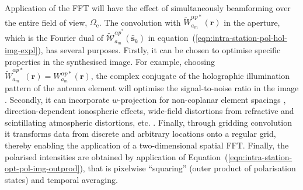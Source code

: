 \documentclass[
  journal=pasa,
  manuscript=article-type,
  year=2020,
  volume=37,
]{cup-journal}
\begin{document}

Application of the FFT will have the effect of simultaneously beamforming over the entire field of view, $\Omega_\textrm{e}$. The convolution with $\widetilde{W}_{a_m}^{\alpha p*}(\boldsymbol{r})$ in the aperture, which is the Fourier dual of $\widetilde{\mathcal{W}}_{a_m}^{{\alpha p}^*}(\hat{\boldsymbol{s}}_k)$ in equation~(\ref{eqn:intra-station-pol-hol-img-expl}), has several purposes. Firstly, it can be chosen to optimise specific properties in the synthesised image. For example, choosing $\widetilde{W}_{a_m}^{\alpha p*}(\boldsymbol{r})=W_{a_m}^{\alpha p*}(\boldsymbol{r})$, the complex conjugate of the holographic illumination pattern of the antenna element will optimise the signal-to-noise ratio in the image \citep{Morales2011}. Secondly, it can incorporate $w$-projection for non-coplanar element spacings \citep{Cornwell+2008}, direction-dependent ionospheric effects, wide-field distortions from refractive and scintillating atmospheric distortions, etc. \citep{Morales+2009,Morales2011}. Finally, through gridding convolution it transforms data from discrete and arbitrary locations onto a regular grid, thereby enabling the application of a two-dimensional spatial FFT. Finally, the polarised intensities are obtained by application of Equation~(\ref{eqn:intra-station-opt-pol-img-outprod}), that is pixelwise ``squaring'' (outer product of polarisation states) and temporal averaging.
\end{document}
